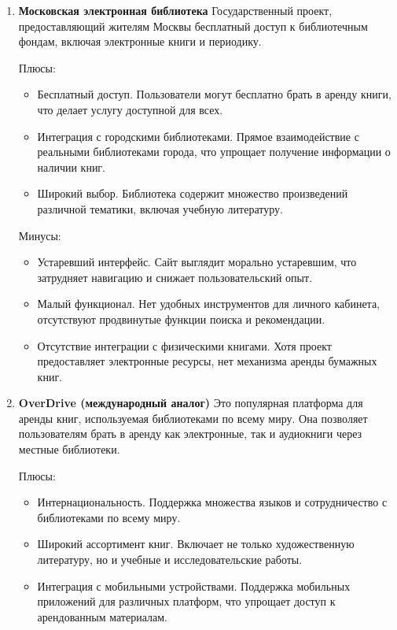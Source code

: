 \begin{enumerate}
  \item \textbf{Московская электронная библиотека} \cite{moscowlib}
  Государственный проект, предоставляющий жителям Москвы бесплатный доступ к библиотечным фондам, включая электронные книги и периодику.

  Плюсы:
  \begin{itemize}
    \item Бесплатный доступ. Пользователи могут бесплатно брать в аренду книги, что делает услугу доступной для всех.
    \item Интеграция с городскими библиотеками. Прямое взаимодействие с реальными библиотеками города, что упрощает получение информации о наличии книг.
    \item Широкий выбор. Библиотека содержит множество произведений различной тематики, включая учебную литературу.
  \end{itemize}

  Минусы:
  \begin{itemize}
    \item Устаревший интерфейс. Сайт выглядит морально устаревшим, что затрудняет навигацию и снижает пользовательский опыт.
    \item Малый функционал. Нет удобных инструментов для личного кабинета, отсутствуют продвинутые функции поиска и рекомендации.
    \item Отсутствие интеграции с физическими книгами. Хотя проект предоставляет электронные ресурсы, нет механизма аренды бумажных книг.
  \end{itemize}

  \item \textbf{OverDrive (международный аналог)} \cite{overdrive}
  Это популярная платформа для аренды книг, используемая библиотеками по всему миру. Она позволяет пользователям брать в аренду как электронные, так и аудиокниги через местные библиотеки.

  Плюсы:
  \begin{itemize}
    \item Интернациональность. Поддержка множества языков и сотрудничество с библиотеками по всему миру.
    \item Широкий ассортимент книг. Включает не только художественную литературу, но и учебные и исследовательские работы.
    \item Интеграция с мобильными устройствами. Поддержка мобильных приложений для различных платформ, что упрощает доступ к арендованным материалам.
  \end{itemize}


\end{enumerate}
